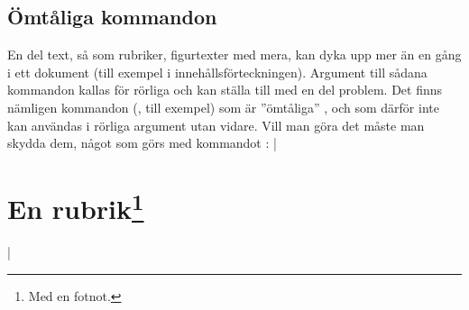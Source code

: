 \documentclass[10pt,../../a4.tex]{subfiles}
\begin{document}
\subsection{Ömtåliga kommandon}
En del text, så som rubriker, figurtexter med mera, kan dyka upp mer än en
gång i ett dokument (till exempel i innehållsförteckningen). Argument till
sådana kommandon kallas för rörliga  och kan ställa
till med en del problem. Det finns nämligen kommandon (,
till exempel) som är ”ömtåliga” , och som därför inte kan
användas i rörliga argument utan vidare. Vill man göra det måste man
skydda dem, något som görs med kommandot :
\latex|\section{En rubrik\protect\footnote{Med en fotnot.}}|
\end{document}
